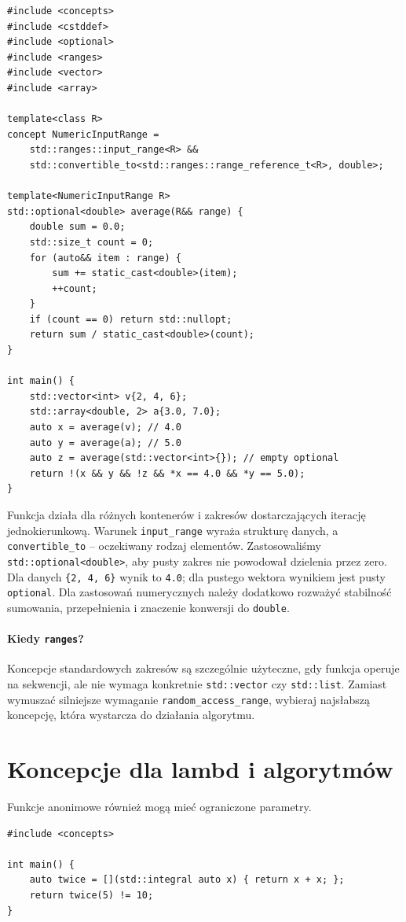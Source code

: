 \begin{lstlisting}
#include <concepts>
#include <cstddef>
#include <optional>
#include <ranges>
#include <vector>
#include <array>

template<class R>
concept NumericInputRange =
    std::ranges::input_range<R> &&
    std::convertible_to<std::ranges::range_reference_t<R>, double>;

template<NumericInputRange R>
std::optional<double> average(R&& range) {
    double sum = 0.0;
    std::size_t count = 0;
    for (auto&& item : range) {
        sum += static_cast<double>(item);
        ++count;
    }
    if (count == 0) return std::nullopt;
    return sum / static_cast<double>(count);
}

int main() {
    std::vector<int> v{2, 4, 6};
    std::array<double, 2> a{3.0, 7.0};
    auto x = average(v); // 4.0
    auto y = average(a); // 5.0
    auto z = average(std::vector<int>{}); // empty optional
    return !(x && y && !z && *x == 4.0 && *y == 5.0);
}
\end{lstlisting}

Funkcja działa dla różnych kontenerów i zakresów dostarczających
iterację jednokierunkową. Warunek \texttt{input\_range}
wyraża strukturę danych, a \texttt{convertible\_to}
-- oczekiwany rodzaj elementów. Zastosowaliśmy
\texttt{std::optional<double>}, aby pusty zakres nie powodował
dzielenia przez zero. Dla danych \texttt{\{2, 4, 6\}}
wynik to \texttt{4.0}; dla pustego wektora wynikiem jest
pusty \texttt{optional}. Dla zastosowań numerycznych należy
dodatkowo rozważyć stabilność sumowania, przepełnienia i
znaczenie konwersji do \texttt{double}.

\paragraph{Kiedy \texttt{ranges}?}
Koncepcje standardowych zakresów są szczególnie użyteczne,
gdy funkcja operuje na sekwencji, ale nie wymaga konkretnie
\texttt{std::vector} czy \texttt{std::list}. Zamiast wymuszać
silniejsze wymaganie \texttt{random\_access\_range},
wybieraj najsłabszą koncepcję, która wystarcza do działania
algorytmu.

\section{Koncepcje dla lambd i algorytmów}

Funkcje anonimowe również mogą mieć ograniczone parametry.

\begin{lstlisting}
#include <concepts>

int main() {
    auto twice = [](std::integral auto x) { return x + x; };
    return twice(5) != 10;
}
\end{lstlisting}

